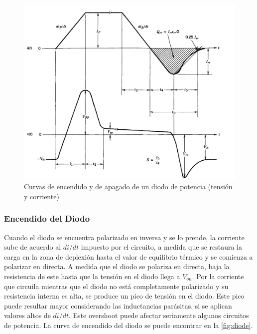 \documentclass[e4_tp1_main.tex]{subfiles}
\begin{document}
\begin{figure}[H]
  \centering
  \includegraphics[width=\linewidth/2]{images/ej1/diode.png}
  \caption{Curvas de encendido y de apagado de un diodo de potencia (tensión y corriente)}
  \label{fig:diode}
\end{figure}

\subsubsection{Encendido del Diodo}
Cuando el diodo se encuentra polarizado en inversa y se lo prende, la corriente sube de acuerdo al $di/dt$ impuesto por el circuito, a medida que se restaura la carga en la zona de deplexión hasta el valor de equilibrio térmico y se comienza a polarizar en directa. A medida que el diodo se polariza en directa, baja la resistencia de este hasta que la tensión en el diodo llega a $V_{on}$. Por la corriente que circuila mientras que el diodo no está completamente polarizado y su resistencia interna es alta, se produce un pico de tensión en el diodo. Este pico puede resultar mayor considerando las inductancias parásitas, si se aplican valores altos de $di/dt$. Este overshoot puede afectar seriamente algunos circuitos de potencia. La curva de encendido del diodo se puede encontrar en la \autoref{fig:diode}.
\end{document}
